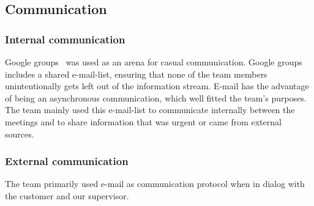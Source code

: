 \subsection{Communication}
\subsubsection{Internal communication}
Google groups~\cite{ggroups} was used as an arena for casual communication. Google groups includes a shared e-mail-list, ensuring that none of the team members unintentionally gets left out of the information stream. E-mail has the advantage of being an asynchronous communication, which well fitted the team's purposes. The team mainly used this e-mail-list to communicate internally between the meetings and to share information that was urgent or came from external sources. 

\subsubsection{External communication}
The team primarily used e-mail as communication protocol when in dialog with the customer and our supervisor.